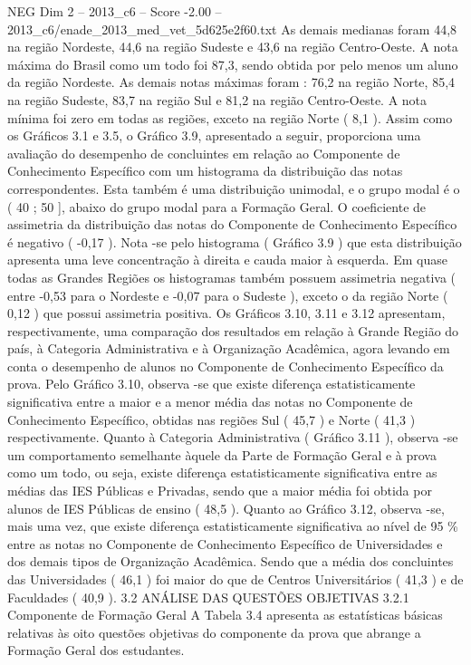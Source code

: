 \begin{textsample}{NEG Dim 2 – 2013\_c6 – Score -2.00 – 2013\_c6/enade\_2013\_med\_vet\_5d625e2f60.txt}
As demais medianas foram 44,8 na região Nordeste, 44,6 na região Sudeste e 43,6 na região Centro-Oeste.
A nota máxima do Brasil como um todo foi 87,3, sendo obtida por pelo menos um aluno da região Nordeste.
As demais notas máximas foram : 76,2 na região Norte, 85,4 na região Sudeste, 83,7 na região Sul e 81,2 na região Centro-Oeste.
A nota mínima foi zero em todas as regiões, exceto na região Norte ( 8,1 ).
Assim como os Gráficos 3.1 e 3.5, o Gráfico 3.9, apresentado a seguir, proporciona uma avaliação do desempenho de concluintes em relação ao Componente de Conhecimento Específico com um histograma da distribuição das notas correspondentes.
Esta também é uma distribuição unimodal, e o grupo modal é o ( 40 ; 50 ], abaixo do grupo modal para a Formação Geral.
O coeficiente de assimetria da distribuição das notas do Componente de Conhecimento Específico é negativo ( -0,17 ).
Nota -se pelo histograma ( Gráfico 3.9 ) que esta distribuição apresenta uma leve concentração à direita e cauda maior à esquerda.
Em quase todas as Grandes Regiões os histogramas também possuem assimetria negativa ( entre -0,53 para o Nordeste e -0,07 para o Sudeste ), exceto o da região Norte ( 0,12 ) que possui assimetria positiva.
Os Gráficos 3.10, 3.11 e 3.12 apresentam, respectivamente, uma comparação dos resultados em relação à Grande Região do país, à Categoria Administrativa e à Organização Acadêmica, agora levando em conta o desempenho de alunos no Componente de Conhecimento Específico da prova.
Pelo Gráfico 3.10, observa -se que existe diferença estatisticamente significativa entre a maior e a menor média das notas no Componente de Conhecimento Específico, obtidas nas regiões Sul ( 45,7 ) e Norte ( 41,3 ) respectivamente.
Quanto à Categoria Administrativa ( Gráfico 3.11 ), observa -se um comportamento semelhante àquele da Parte de Formação Geral e à prova como um todo, ou seja, existe diferença estatisticamente significativa entre as médias das IES Públicas e Privadas, sendo que a maior média foi obtida por alunos de IES Públicas de ensino ( 48,5 ).
Quanto ao Gráfico 3.12, observa -se, mais uma vez, que existe diferença estatisticamente significativa ao nível de 95 \% entre as notas no Componente de Conhecimento Específico de Universidades e dos demais tipos de Organização Acadêmica.
Sendo que a média dos concluintes das Universidades ( 46,1 ) foi maior do que de Centros Universitários ( 41,3 ) e de Faculdades ( 40,9 ). 3.2 ANÁLISE DAS QUESTÕES OBJETIVAS 3.2.1 Componente de Formação Geral A Tabela 3.4 apresenta as estatísticas básicas relativas às oito questões objetivas do componente da prova que abrange a Formação Geral dos estudantes.

\end{textsample}
